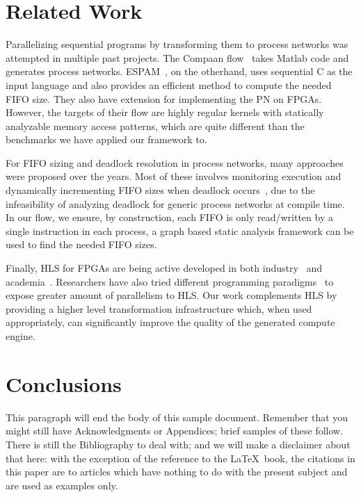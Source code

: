 \documentclass{sig-alternate}
\begin{document}
\section{Related Work}
\label{relatedwork}
Parallelizing sequential programs by transforming them to process networks was attempted in multiple past projects. The Compaan flow~\cite{mat2pn} takes Matlab code and generates
process networks. ESPAM~\cite{4378214}\cite{c2stream}, on the otherhand, uses sequential C as the input language and also provides an efficient method to compute the needed FIFO size. They also have extension for implementing the PN on FPGAs. However, the targets of their flow are highly regular kernels with statically analyzable memory access patterns, which are quite different than the benchmarks we have applied our framework to. 

For FIFO sizing and deadlock resolution in process networks, many approaches were proposed over the years. Most of these involves monitoring execution and dynamically incrementing FIFO sizes when deadlock occurs~\cite{parks1995bounded}\cite{Geilen:2003:REK:1765712.1765736}\cite{4217338}, 
due to the infeasibility of analyzing deadlock for generic process networks at compile time. In our flow, we ensure, by construction, each FIFO is only read/written by a single instruction in each process, a graph based static analysis framework can be used to find the needed FIFO sizes.

Finally, HLS for FPGAs are being active developed in both industry~\cite{tools:vivadohls} and academia~\cite{tools:legup}. Researchers
have also tried different programming paradigms~\cite{Lebedev:2010:MMA:1935936.1936078}
to expose greater amount of parallelism to HLS. Our work complements
HLS by providing a higher level transformation infrastructure which, when
used appropriately, can significantly improve the quality of the generated compute engine.






\section{Conclusions}
\label{conclude}
This paragraph will end the body of this sample document.
Remember that you might still have Acknowledgments or
Appendices; brief samples of these
follow.  There is still the Bibliography to deal with; and
we will make a disclaimer about that here: with the exception
of the reference to the \LaTeX\ book, the citations in
this paper are to articles which have nothing to
do with the present subject and are used as
examples only.
\end{document}
